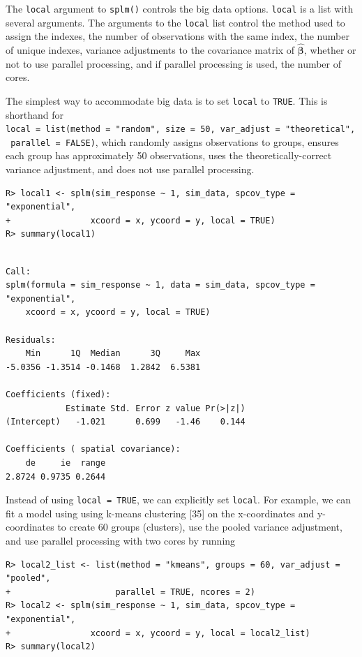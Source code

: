 \documentclass[10pt,letterpaper]{article}
\begin{document}
The \texttt{local} argument to \texttt{splm()} controls the big data
options. \texttt{local} is a list with several arguments. The arguments
to the \texttt{local} list control the method used to assign the
indexes, the number of observations with the same index, the number of
unique indexes, variance adjustments to the covariance matrix of
\(\hat{\boldsymbol{\beta}}\), whether or not to use parallel processing,
and if parallel processing is used, the number of cores.

The simplest way to accommodate big data is to set \texttt{local} to
\texttt{TRUE}. This is shorthand for
\texttt{local\ =\ list(method\ =\ "random",\ size\ =\ 50,\ var\_adjust\ =\ "theoretical",\ parallel\ =\ FALSE)},
which randomly assigns observations to groups, ensures each group has
approximately 50 observations, uses the theoretically-correct variance
adjustment, and does not use parallel processing.

\begin{verbatim}
R> local1 <- splm(sim_response ~ 1, sim_data, spcov_type = "exponential", 
+                xcoord = x, ycoord = y, local = TRUE)
R> summary(local1)
\end{verbatim}

\begin{verbatim}

Call:
splm(formula = sim_response ~ 1, data = sim_data, spcov_type = "exponential", 
    xcoord = x, ycoord = y, local = TRUE)

Residuals:
    Min      1Q  Median      3Q     Max 
-5.0356 -1.3514 -0.1468  1.2842  6.5381 

Coefficients (fixed):
            Estimate Std. Error z value Pr(>|z|)
(Intercept)   -1.021      0.699   -1.46    0.144

Coefficients ( spatial covariance):
    de     ie  range 
2.8724 0.9735 0.2644 
\end{verbatim}

Instead of using \texttt{local\ =\ TRUE}, we can explicitly set
\texttt{local}. For example, we can fit a model using using k-means
clustering {[}35{]} on the x-coordinates and y-coordinates to create 60
groups (clusters), use the pooled variance adjustment, and use parallel
processing with two cores by running

\begin{verbatim}
R> local2_list <- list(method = "kmeans", groups = 60, var_adjust = "pooled",
+                     parallel = TRUE, ncores = 2)
R> local2 <- splm(sim_response ~ 1, sim_data, spcov_type = "exponential", 
+                xcoord = x, ycoord = y, local = local2_list)
R> summary(local2)
\end{verbatim}
\end{document}
